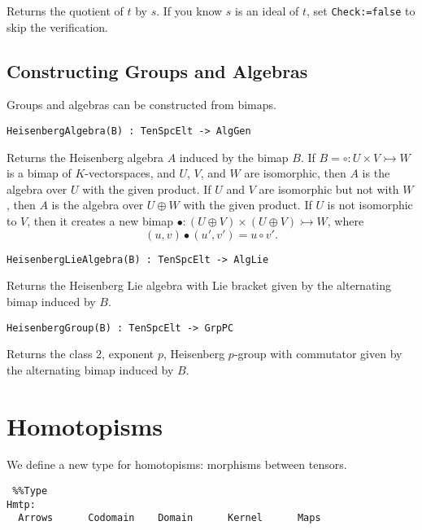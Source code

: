 \documentclass{amsart}
\begin{document}
Returns the quotient of $t$ by $s$. If you know $s$ is an ideal of $t$, set 
{\tt Check:=false} to skip the verification.

\subsection{Constructing Groups and Algebras}
Groups and algebras can be constructed from bimaps.

\color{blue}
{\small \begin{verbatim}
HeisenbergAlgebra(B) : TenSpcElt -> AlgGen
\end{verbatim} }
\color{black}

Returns the Heisenberg algebra $A$ induced by the bimap $B$. If $B=\circ : 
U\times V\rightarrowtail W$ is a bimap of $K$-vectorspaces, and $U$, $V$, and 
$W$ are isomorphic, then $A$ is the algebra over $U$ with the given product. If 
$U$ and $V$ are isomorphic but not with $W$, then $A$ is the algebra over 
$U\oplus W$ with the given product. If $U$ is not isomorphic to $V$, then it 
creates a new bimap $\bullet:(U\oplus V) \times (U\oplus V)\rightarrowtail W$, 
where 
\[ (u,v)\bullet (u',v') = u\circ v'. \]

\color{blue}
{\small \begin{verbatim}
HeisenbergLieAlgebra(B) : TenSpcElt -> AlgLie
\end{verbatim} }
\color{black}

Returns the Heisenberg Lie algebra with Lie bracket given by the alternating 
bimap induced by $B$.

\color{blue}
{\small \begin{verbatim}
HeisenbergGroup(B) : TenSpcElt -> GrpPC
\end{verbatim} }
\color{black}

Returns the class 2, exponent $p$, Heisenberg $p$-group with commutator given by
the alternating bimap induced by $B$.

\section{Homotopisms}

We define a new type for homotopisms: morphisms between tensors.
\color{blue}
{\small \begin{verbatim} %%Type
Hmtp:
  Arrows      Codomain    Domain      Kernel      Maps
\end{verbatim} }
\color{black}
\end{document}
